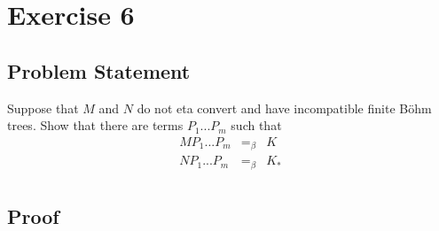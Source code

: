 \chapter{Exercise 6}
\lhead{\today}

\section{Problem Statement}
Suppose that $M$ and $N$ do not eta convert and have incompatible finite B\"ohm trees. Show that there are terms $P_{1} ... P_{m}$ such that
\begin{eqnarray*}
  M P_{1} ... P_{m} &=_\beta& K\\
  N P_{1} ... P_{m} &=_\beta& K_*\\
\end{eqnarray*}

\section{Proof}
